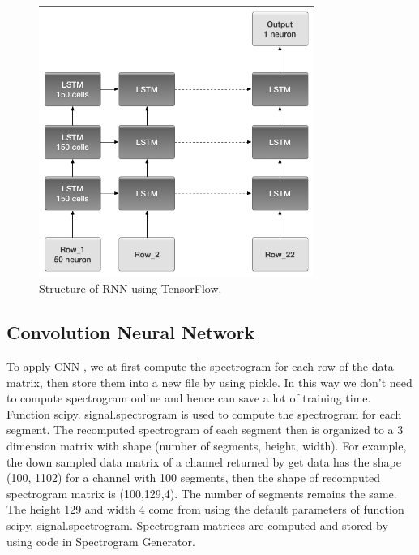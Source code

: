 \documentclass[a4paper]{article}
\begin{document}
\begin{figure}
\centering
\includegraphics[width=0.8\textwidth]{RNN.png}
\caption{\label{fig:RNN}Structure of RNN using TensorFlow.}
\end{figure}


\subsection{Convolution Neural Network}
To apply CNN \cite{krizhevsky2012imagenet}, we at first compute the spectrogram for each row of the data matrix, then store them into a new file by using pickle. In this way we don’t need to compute spectrogram online and hence can save a lot of training time. Function scipy. signal.spectrogram is used to compute the spectrogram for each segment. The recomputed spectrogram of each segment then is organized to a 3 dimension matrix with shape (number of segments, height, width). For example, the down sampled data matrix of a channel returned by get data has the shape (100, 1102) for a channel with 100 segments, then the shape of recomputed spectrogram matrix is (100,129,4). The number of segments remains the same. The height 129 and width 4 come from using the default parameters of function scipy. signal.spectrogram. Spectrogram matrices are computed and stored by using code in Spectrogram Generator.
\end{document}
